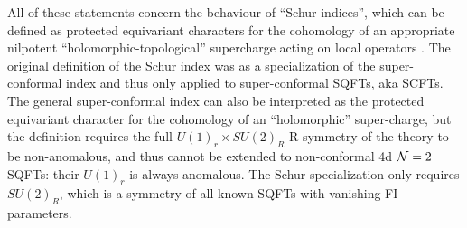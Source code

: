 \documentclass[12pt]{amsart}
\begin{document}
All of these statements concern the behaviour of ``Schur indices'', which can be defined as protected equivariant characters for the cohomology of an appropriate nilpotent ``holomorphic-topological'' supercharge acting on local operators \cite{Kapustin:2006hi,Niu:2021jet}. The original definition of the Schur index was as a specialization of the super-conformal index \cite{Kinney:2005ej,Romelsberger:2005eg,Gadde:2011ik,Gadde:2011uv} and thus only applied to super-conformal SQFTs, aka SCFTs. The general super-conformal index can also be interpreted as the protected equivariant character for the cohomology of an ``holomorphic'' super-charge, but the definition requires the full $U(1)_r \times SU(2)_R$ R-symmetry of the theory to be non-anomalous, and thus cannot be extended to non-conformal 4d ${\cal N}=2$ SQFTs: their $U(1)_r$ is always anomalous. 
The Schur specialization only requires $SU(2)_R$, which is a symmetry of all known  SQFTs with vanishing FI parameters. 
\end{document}
